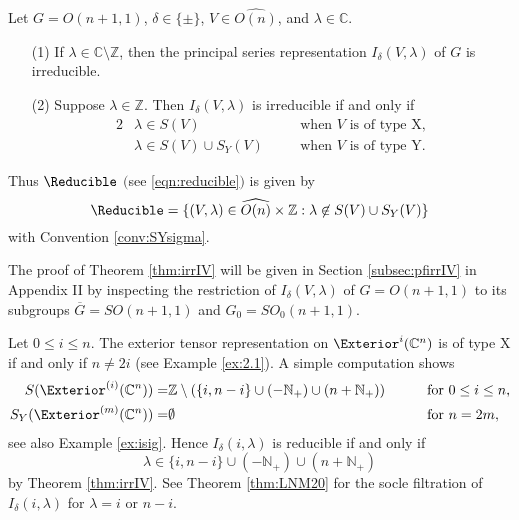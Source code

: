 \begin{theorem}
\label{thm:irrIV}
Let $G=O(n+1,1)$, $\delta \in \{\pm\}$, 
 $V \in \widehat{O(n)}$,
 and $\lambda \in {\mathbb{C}}$.  
\begin{enumerate}
\item[{\rm{(1)}}]
If $\lambda \in {\mathbb{C}} \setminus {\mathbb{Z}}$, 
 then the principal series representation $I_{\delta} (V,\lambda)$ of $G$ 
 is irreducible.  
\item[{\rm{(2)}}]
Suppose $\lambda \in {\mathbb{Z}}$.  
Then $I_{\delta}(V,\lambda)$ is irreducible if and only if
\begin{alignat*}{2}
&\text{$\lambda \in S(V)$}
&&\text{when $V$ is of type X}, 
\\
&\text{$\lambda \in S(V) \cup S_Y(V)$}
\quad
&&\text{when $V$ is of type Y}.  
\end{alignat*}
\end{enumerate}
Thus $\Reducible$
 $($see \eqref{eqn:reducible}$)$
 is given by 
\begin{equation}
\label{eqn:Red}
  \Reducible
 =\{(V, \lambda) \in \widehat{O(n)} \times {\mathbb{Z}}
  : \lambda \not \in S(V) \cup S_Y(V)\}
\end{equation}
with Convention \ref{conv:SYsigma}.  
\end{theorem}
The proof of Theorem \ref{thm:irrIV} will be given 
in Section \ref{subsec:pfirrIV} in Appendix II
 by inspecting the restriction of $I_{\delta}(V,\lambda)$
 of $G=O(n+1,1)$
 to its subgroups $\overline G=SO(n+1,1)$ and $G_0=SO_0(n+1,1)$.  

\begin{example}
\label{ex:irrIilmd}
Let $0 \le i \le n$.  
The exterior tensor representation
 on $\Exterior^i({\mathbb{C}}^n)$ is of type X
 if and only if $n \ne 2i$
 (see Example \ref{ex:2.1}).  
A simple computation shows
\begin{alignat*}{2}
S(\Exterior^{(i)}({\mathbb{C}}^n))=&{\mathbb{Z}} 
   \setminus (\{i,n-i\} \cup (-{\mathbb{N}}_+) \cup (n+{\mathbb{N}}_+))
\qquad
&&\text{for $0 \le i \le n$}, 
\\
S_Y(\Exterior^{(m)}({\mathbb{C}}^n))=& \emptyset
\qquad
&&\text{for $n=2m$}, 
\end{alignat*}
 see also Example \ref{ex:isig}.  
Hence $I_{\delta}(i,\lambda)$ is reducible 
 if and only if
\[
   \lambda \in \{i,n-i\} \cup (-{\mathbb{N}}_+) \cup (n+{\mathbb{N}}_+)
\]
by Theorem \ref{thm:irrIV}.  
See Theorem \ref{thm:LNM20}
 for the socle filtration of $I_{\delta}(i,\lambda)$
 for $\lambda =i$ or $n-i$.  
\end{example}




